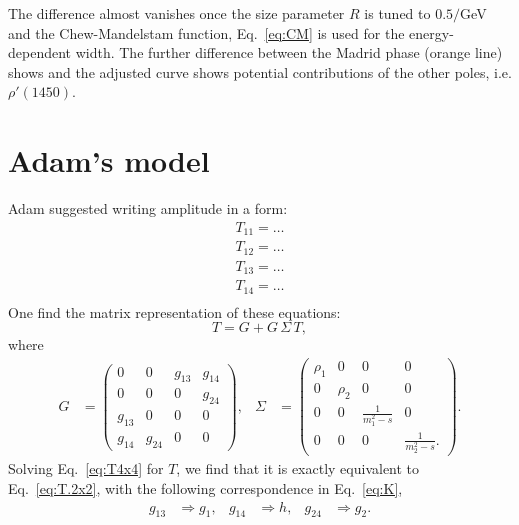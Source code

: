 \documentclass[aps,prd,superscriptaddress,onecolumn,nofootinbib,preprintnumbers,notitlepage]{revtex4-1}
\begin{document}
The difference almost vanishes once the size parameter $R$ is tuned to $0.5/$GeV and the Chew-Mandelstam function, Eq.~\eqref{eq:CM} is used for the energy-dependent width.
The further difference between the Madrid phase (orange line) shows and the adjusted curve
shows potential contributions of the other poles, i.e. $\rho'(1450)$.

\section{Adam's model}
Adam suggested writing amplitude in a form:
\begin{align*}
  T_{11} = \dots\\
  T_{12} = \dots\\
  T_{13} = \dots\\
  T_{14} = \dots\\
\end{align*}
One find the matrix representation of these equations:
\begin{equation} \label{eq:T4x4}
  T = G + G\,\Sigma\,T,
\end{equation}
where
\begin{align}
  G &=
  \begin{pmatrix}0 & 0 & g_{13} & g_{14}\\0 & 0 & 0 & g_{24}\\g_{13} & 0 & 0 & 0\\g_{14} & g_{24} & 0 & 0\end{pmatrix},&
  \Sigma &=
  \begin{pmatrix}
    \rho_1 & 0 & 0 & 0\\
     0 & \rho_2 & 0 & 0\\
     0 & 0 & \frac{1}{m_1^2-s} & 0\\
     0 & 0 & 0 & \frac{1}{m_2^2-s}.
  \end{pmatrix}.
\end{align}
Solving Eq.~\eqref{eq:T4x4} for $T$, we find that it is exactly equivalent to Eq.~\eqref{eq:T.2x2},
with the following correspondence in Eq.~\eqref{eq:K},
\begin{align}
  g_{13} &\Rightarrow g_1,&
  g_{14} &\Rightarrow h,&
  g_{24} &\Rightarrow g_2.
\end{align}
\end{document}
